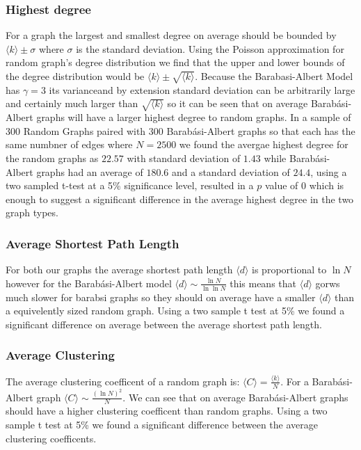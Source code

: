 \documentclass{article}
\begin{document}
                \subsubsection{Highest degree}
                For a graph the largest and smallest degree on average should be bounded by $\langle k \rangle \pm \sigma$ where $\sigma$ is the standard deviation. Using the Poisson approximation for random graph's degree distribution we find that the upper and lower bounds of the degree distribution would be $\langle k \rangle \pm \sqrt{\langle k \rangle}$. Because the Barabasi-Albert Model has $\gamma = 3$ its varianceand by extension standard deviation can be arbitrarily large and certainly much larger than $\sqrt{\langle k \rangle}$ so it can be seen that on average Barabási-Albert graphs will have a larger highest degree to random graphs. In a sample of 300 Random Graphs paired with 300 Barabási-Albert graphs so that each has the same numbner of edges where $N =2500$ we found the avergae highest degree for the random graphs as $22.57$ with standard deviation of $1.43$ while Barabási-Albert graphs had an average of $180.6$ and a standard deviation of $24.4$, using a two sampled t-test at a 5\% significance level, resulted in a $p$ value of 0 which is enough to suggest a significant difference in the average highest degree in the two graph types.
                \subsubsection{Average Shortest Path Length}
                For both our graphs the average shortest path length $\langle d \rangle$ is proportional to $\ln N$ however for the Barabási-Albert model  $\langle d \rangle \sim \frac{\ln N}{\ln \ln N}$ this means that $\langle d \rangle$ gorws much slower for barabsi graphs so they should on average have a smaller $\langle d \rangle$ than a equivelently sized random graph. Using a two sample  t test at 5\% we found a significant difference on average between the average shortest path length.
                \subsubsection{Average Clustering}
                The average clustering coefficent of a random graph is: $\langle C \rangle = \frac{\langle k \rangle}{N}$. For a Barabási-Albert graph $\langle C \rangle \sim \frac{(\ln N)^2}{N}$. We can see that on average Barabási-Albert graphs should have a higher clustering coefficent than random graphs. Using a two sample t test at 5\% we found a significant difference between the average clustering coefficents.
\end{document}
